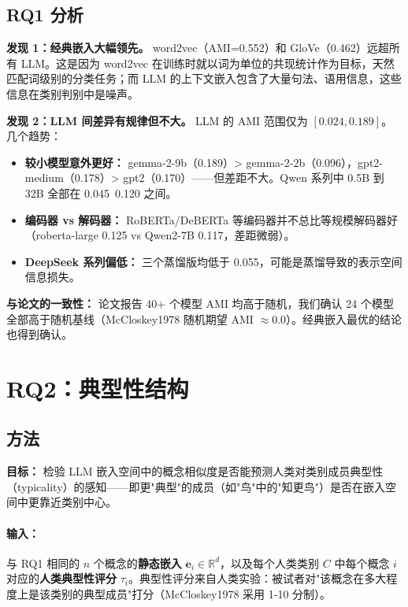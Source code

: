 \documentclass[11pt,a4paper]{article}
\begin{document}
\subsection{RQ1 分析}

\textbf{发现 1：经典嵌入大幅领先。} word2vec（AMI=0.552）和 GloVe（0.462）远超所有 LLM。这是因为 word2vec 在训练时就以词为单位的共现统计作为目标，天然匹配词级别的分类任务；而 LLM 的上下文嵌入包含了大量句法、语用信息，这些信息在类别判别中是噪声。

\textbf{发现 2：LLM 间差异有规律但不大。} LLM 的 AMI 范围仅为 $[0.024, 0.189]$。几个趋势：
\begin{itemize}[noitemsep]
  \item \textbf{较小模型意外更好：} gemma-2-9b（0.189）> gemma-2-2b（0.096），gpt2-medium（0.178）> gpt2（0.170）——但差距不大。Qwen 系列中 0.5B 到 32B 全部在 0.045~0.120 之间。
  \item \textbf{编码器 vs 解码器：} RoBERTa/DeBERTa 等编码器并不总比等规模解码器好（roberta-large 0.125 vs Qwen2-7B 0.117，差距微弱）。
  \item \textbf{DeepSeek 系列偏低：} 三个蒸馏版均低于 0.055，可能是蒸馏导致的表示空间信息损失。
\end{itemize}

\textbf{与论文的一致性：} 论文报告 40+ 个模型 AMI 均高于随机，我们确认 24 个模型全部高于随机基线（McCloskey1978 随机期望 AMI $\approx 0.0$）。经典嵌入最优的结论也得到确认。

\section{RQ2：典型性结构}

\subsection{方法}

\textbf{目标：} 检验 LLM 嵌入空间中的概念相似度是否能预测人类对类别成员典型性（typicality）的感知——即更"典型"的成员（如"鸟"中的"知更鸟"）是否在嵌入空间中更靠近类别中心。

\paragraph{输入：} 与 RQ1 相同的 $n$ 个概念的\textbf{静态嵌入} $\mathbf{e}_i \in \mathbb{R}^d$，以及每个人类类别 $C$ 中每个概念 $i$ 对应的\textbf{人类典型性评分} $\tau_i$。典型性评分来自人类实验：被试者对"该概念在多大程度上是该类别的典型成员"打分（McCloskey1978 采用 1-10 分制）。
\end{document}
